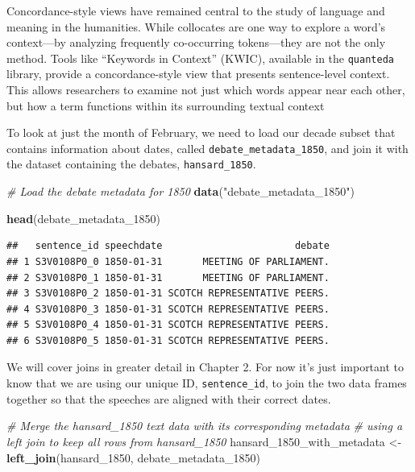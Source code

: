 \documentclass[
]{article}
\newenvironment{Shaded}{\begin{snugshade}}{\end{snugshade}}
\newcommand{\CommentTok}[1]{\textcolor[rgb]{0.56,0.35,0.01}{\textit{#1}}}
\newcommand{\FunctionTok}[1]{\textcolor[rgb]{0.13,0.29,0.53}{\textbf{#1}}}
\newcommand{\NormalTok}[1]{#1}
\newcommand{\OtherTok}[1]{\textcolor[rgb]{0.56,0.35,0.01}{#1}}
\newcommand{\StringTok}[1]{\textcolor[rgb]{0.31,0.60,0.02}{#1}}
\begin{document}
Concordance-style views have remained central to the study of language
and meaning in the humanities. While collocates are one way to explore a
word's context---by analyzing frequently co-occurring tokens---they are
not the only method. Tools like ``Keywords in Context'' (KWIC),
available in the \texttt{quanteda} library, provide a concordance-style
view that presents sentence-level context. This allows researchers to
examine not just which words appear near each other, but how a term
functions within its surrounding textual context

To look at just the month of February, we need to load our decade subset
that contains information about dates, called
\texttt{debate\_metadata\_1850}, and join it with the dataset containing
the debates, \texttt{hansard\_1850}.

\begin{Shaded}
\begin{Highlighting}[]
\CommentTok{\# Load the debate metadata for 1850}
\FunctionTok{data}\NormalTok{(}\StringTok{"debate\_metadata\_1850"}\NormalTok{)}
\end{Highlighting}
\end{Shaded}

\begin{Shaded}
\begin{Highlighting}[]
\FunctionTok{head}\NormalTok{(debate\_metadata\_1850)}
\end{Highlighting}
\end{Shaded}

\begin{verbatim}
##   sentence_id speechdate                       debate
## 1 S3V0108P0_0 1850-01-31       MEETING OF PARLIAMENT.
## 2 S3V0108P0_1 1850-01-31       MEETING OF PARLIAMENT.
## 3 S3V0108P0_2 1850-01-31 SCOTCH REPRESENTATIVE PEERS.
## 4 S3V0108P0_3 1850-01-31 SCOTCH REPRESENTATIVE PEERS.
## 5 S3V0108P0_4 1850-01-31 SCOTCH REPRESENTATIVE PEERS.
## 6 S3V0108P0_5 1850-01-31 SCOTCH REPRESENTATIVE PEERS.
\end{verbatim}

We will cover joins in greater detail in Chapter 2. For now it's just
important to know that we are using our unique ID,
\texttt{sentence\_id}, to join the two data frames together so that the
speeches are aligned with their correct dates.

\begin{Shaded}
\begin{Highlighting}[]
\CommentTok{\# Merge the hansard\_1850 text data with its corresponding metadata}
\CommentTok{\# using a left join to keep all rows from hansard\_1850}
\NormalTok{hansard\_1850\_with\_metadata }\OtherTok{\textless{}{-}} \FunctionTok{left\_join}\NormalTok{(hansard\_1850, debate\_metadata\_1850)}
\end{Highlighting}
\end{Shaded}
\end{document}
